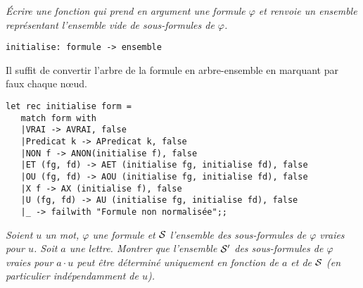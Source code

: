 \newpage
\begin{Exercise}\it
Écrire une fonction  qui prend en argument une formule $\varphi$ et renvoie un ensemble représentant l'ensemble vide de sous-formules de $\varphi$. 
\begin{lstlisting}
initialise: formule -> ensemble
\end{lstlisting}
\end{Exercise}
\begin{Answer}
Il suffit de convertir l’arbre de la formule en arbre-ensemble en marquant par faux chaque nœud.
\begin{lstlisting}
let rec initialise form = 
   match form with 
   |VRAI -> AVRAI, false
   |Predicat k -> APredicat k, false
   |NON f -> ANON(initialise f), false
   |ET (fg, fd) -> AET (initialise fg, initialise fd), false
   |OU (fg, fd) -> AOU (initialise fg, initialise fd), false
   |X f -> AX (initialise f), false
   |U (fg, fd) -> AU (initialise fg, initialise fd), false
   |_ -> failwith "Formule non normalisée";;
\end{lstlisting} 
\end{Answer}
\begin{Exercise}\it
Soient $u$ un mot, $\varphi$ une formule et $\cal S$ l'ensemble des sous-formules de $\varphi$ vraies pour $u$. Soit $a$ une lettre. Montrer que l'ensemble $\cal S'$ des sous-formules de $\varphi$ vraies pour $a\cdot u$ peut être déterminé uniquement en fonction de $a$ et de $\cal S$ (en particulier indépendamment de $u$).
\end{Exercise}
